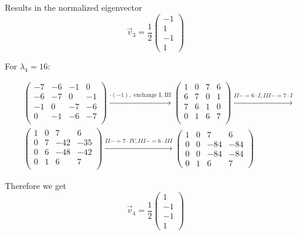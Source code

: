 \documentclass[a4paper,german,12pt,smallheadings]{scrartcl}
\begin{document}
\begin{enumerate}[a)]
    Results in the normalized eigenvector
    \begin{equation*}
      \vec{v}_3 = \frac{1}{2} \begin{pmatrix} -1 \\ 1 \\ -1 \\ 1 \end{pmatrix}
    \end{equation*}

    For $\lambda_4 = 16$:

    \begin{align*}
      &\begin{pmatrix}
        -7 & -6 & -1 & 0 \\
        -6 & -7 & 0 & -1 \\
        -1 & 0 & -7 & -6 \\
        0 & -1 & -6 & -7 \\
      \end{pmatrix}
      \xrightarrow{\cdot (-1),\text{ exchange I, III}}
      \begin{pmatrix}
        1 & 0 & 7 & 6 \\
        6 & 7 & 0 & 1 \\
        7 & 6 & 1 & 0 \\
        0 & 1 & 6 & 7 \\
      \end{pmatrix}
      \xrightarrow{II-=6\cdot I, III -= 7 \cdot I} \\
      &\begin{pmatrix}
        1 & 0 & 7 & 6 \\
        0 & 7 & -42 & -35 \\
        0 & 6 & -48 & -42 \\
        0 & 1 & 6 & 7 \\
      \end{pmatrix}
      \xrightarrow{II-=7 \cdot IV, III -= 6 \cdot III}
      \begin{pmatrix}
        1 & 0 & 7 & 6 \\
        0 & 0 & -84 & -84 \\
        0 & 0 & -84 & -84 \\
        0 & 1 & 6 & 7
      \end{pmatrix}
    \end{align*}

    Therefore we get
    \begin{equation*}
      \vec{v}_4 = \frac{1}{2} \begin{pmatrix} 1 \\ -1 \\ -1 \\ 1\end{pmatrix}
    \end{equation*}

\end{enumerate}
\end{document}
